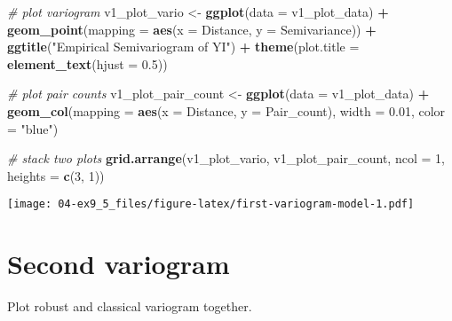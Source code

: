 \documentclass[]{book}
\newenvironment{Shaded}{\begin{snugshade}}{\end{snugshade}}
\newcommand{\CommentTok}[1]{\textcolor[rgb]{0.56,0.35,0.01}{\textit{#1}}}
\newcommand{\DataTypeTok}[1]{\textcolor[rgb]{0.13,0.29,0.53}{#1}}
\newcommand{\DecValTok}[1]{\textcolor[rgb]{0.00,0.00,0.81}{#1}}
\newcommand{\FloatTok}[1]{\textcolor[rgb]{0.00,0.00,0.81}{#1}}
\newcommand{\KeywordTok}[1]{\textcolor[rgb]{0.13,0.29,0.53}{\textbf{#1}}}
\newcommand{\NormalTok}[1]{#1}
\newcommand{\OperatorTok}[1]{\textcolor[rgb]{0.81,0.36,0.00}{\textbf{#1}}}
\newcommand{\StringTok}[1]{\textcolor[rgb]{0.31,0.60,0.02}{#1}}
\begin{document}
\begin{Shaded}
\begin{Highlighting}[]
\CommentTok{# plot variogram}
\NormalTok{v1_plot_vario <-}\StringTok{ }\KeywordTok{ggplot}\NormalTok{(}\DataTypeTok{data =}\NormalTok{ v1_plot_data) }\OperatorTok{+}
\StringTok{  }\KeywordTok{geom_point}\NormalTok{(}\DataTypeTok{mapping =} \KeywordTok{aes}\NormalTok{(}\DataTypeTok{x =}\NormalTok{ Distance, }\DataTypeTok{y =}\NormalTok{ Semivariance)) }\OperatorTok{+}
\StringTok{  }\KeywordTok{ggtitle}\NormalTok{(}\StringTok{"Empirical Semivariogram of YI"}\NormalTok{) }\OperatorTok{+}
\StringTok{  }\KeywordTok{theme}\NormalTok{(}\DataTypeTok{plot.title =} \KeywordTok{element_text}\NormalTok{(}\DataTypeTok{hjust =} \FloatTok{0.5}\NormalTok{))}

\CommentTok{# plot pair counts}
\NormalTok{v1_plot_pair_count <-}\StringTok{ }\KeywordTok{ggplot}\NormalTok{(}\DataTypeTok{data =}\NormalTok{ v1_plot_data) }\OperatorTok{+}
\StringTok{  }\KeywordTok{geom_col}\NormalTok{(}\DataTypeTok{mapping =} \KeywordTok{aes}\NormalTok{(}\DataTypeTok{x =}\NormalTok{ Distance, }\DataTypeTok{y =}\NormalTok{ Pair_count), }\DataTypeTok{width =} \FloatTok{0.01}\NormalTok{, }\DataTypeTok{color =} \StringTok{"blue"}\NormalTok{)}

\CommentTok{# stack two plots}
\KeywordTok{grid.arrange}\NormalTok{(v1_plot_vario, v1_plot_pair_count,}
             \DataTypeTok{ncol =} \DecValTok{1}\NormalTok{, }\DataTypeTok{heights =} \KeywordTok{c}\NormalTok{(}\DecValTok{3}\NormalTok{, }\DecValTok{1}\NormalTok{))}
\end{Highlighting}
\end{Shaded}

\texttt{[image: 04-ex9\_5\_files/figure-latex/first-variogram-model-1.pdf]}

\hypertarget{second-variogram-1}{%
\section{Second variogram}\label{second-variogram-1}}

Plot robust and classical variogram together.

\begin{Shaded}
\end{Shaded}
\end{document}
